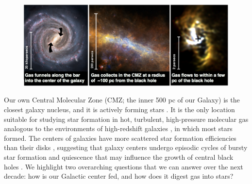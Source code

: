 \documentclass[modern]{aastex62}
\begin{document}
\vspace{-10mm}
\begin{figure}[htp]
    \centering
    \includegraphics[width=1.0\textwidth]{BetsyColorFig.png}
\end{figure}
\vspace{-10mm}

\clearpage


Our own Central Molecular Zone (CMZ; the inner 500 pc of our Galaxy) is the
closest galaxy nucleus, and it is actively forming stars \citep{Morris1996a}.
It is the only location suitable for studying star formation in hot, turbulent,
high-pressure  \citep{Ao2013a, Ginsburg2016a, Krieger2017a}
molecular gas analogous to the environments of high-redshift galaxies
\citep{Kruijssen2013a}, in which most stars formed. The centers of 
galaxies have more scattered star formation efficiencies than their disks
\citep{Leroy2013a,Usero2015a,Bigiel2016a,Gallagher2018a}, suggesting that
galaxy centers undergo episodic cycles of bursty star formation and quiescence
that may influence the growth of central black holes
\citep[e.g.,][]{Kruijssen2014c,Krumholz2017a,Torrey2017c,Seo2019a}.
We highlight two overarching questions that we can answer over the next decade:
how is our Galactic center fed, and how does it digest gas into stars?
\end{document}
